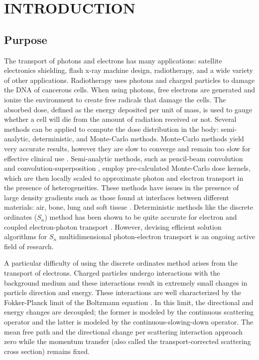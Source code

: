 \pagestyle{plain}
\setcounter{page}{1}
\chapter{\uppercase{Introduction}}
\section{Purpose}
The transport of photons and electrons has many applications: satellite
electronics shielding, flash x-ray machine design, radiotherapy, and a wide
variety of other applications. Radiotherapy uses photons and charged particles to 
damage the DNA of cancerous cells. When using photons, free electrons are 
generated and ionize the environment to create free radicals that damage the cells. 
The absorbed dose, defined as the energy deposited per unit of mass, is used to 
gauge whether a cell will die from the amount of radiation received or not. 
Several methods can be
applied to compute the dose distribution in the body: semi-analytic,
deterministic, and Monte-Carlo methods. Monte-Carlo methods yield very
accurate results, however they are slow to converge and remain too slow for
effective clinical use \cite{acuros,comet}. Semi-analytic methods, such as
pencil-beam convolution \cite{pencil_beam_2,pencil_beam_1} and 
convolution-superposition \cite{superposition}, employ pre-calculated
Monte-Carlo dose kernels, which are then locally scaled to approximate photon
and electron transport in the presence of heterogeneities. These methods
have issues in the presence of large density gradients such as those
found at interfaces between different materials: air, bone, lung and soft
tissue \cite{krieger,seco,acuros}. Deterministic methods like the discrete 
ordinates ($S_n$) method has been shown to be quite accurate for electron and 
coupled electron-photon transport \cite{accuracy_2,morel_81,accuracy_1}.
However, devising efficient solution algorithms for $S_n$ multidimensional
photon-electron transport is an ongoing active field of research.

A particular difficulty of using the discrete ordinates method arises from the
transport of electrons. Charged particles undergo interactions with the 
background medium and these interactions result in extremely small changes in
particle direction and energy. These interactions are well characterized by
the Fokker-Planck limit of the Boltzmann equation \cite{fp_limit,morel_96}. In 
this limit, the directional and energy changes are decoupled; the former is 
modeled by the continuous scattering operator and the latter is modeled by the 
continuous-slowing-down operator. The mean free path and the directional 
change per scattering interaction approach zero while the momentum transfer (also 
called the transport-corrected scattering cross section) remains fixed.

